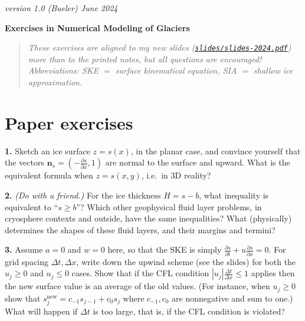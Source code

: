 \documentclass[12pt]{amsart}
\newcommand{\bn}{\mathbf{n}}
\newcommand{\prob}[1]{\bigskip\noindent\textbf{#1.}\quad }
\begin{document}
\scriptsize \hfill \emph{version 1.0 (Bueler) June 2024}
\normalsize\medskip

\large\centerline{\textbf{Exercises in Numerical Modeling of Glaciers}}
\medskip

\normalsize
\begin{quote}
\emph{These exercises are aligned to my new slides {\small \emph{(\href{https://github.com/bueler/mccarthy/blob/master/slides/slides-2024.pdf}{\texttt{slides/slides-2024.pdf}})} } more than to the printed notes, but all questions are encouraged!  Abbreviations: SKE $=$ surface kinematical equation, SIA $=$ shallow ice approximation.}
\end{quote}
\medskip
\thispagestyle{empty}

\section*{Paper exercises}

\prob{1}  Sketch an ice surface $z=s(x)$, in the planar case, and convince yourself that the vectors $\bn_s = (-\frac{\partial s}{\partial x},1)$ are normal to the surface and upward.  What is the equivalent formula when $z=s(x,y)$, i.e.~in 3D reality?

\prob{2}  \emph{(Do with a friend.)}  For the ice thickness $H=s-b$, what inequality is equivalent to ``$s\ge b$''?   Which other geophysical fluid layer problems, in cryosphere contexts and outside, have the same inequalities?  What (physically) determines the shapes of these fluid layers, and their margins and termini?

\prob{3}  Assume $a=0$ and $w=0$ here, so that the SKE is simply $\frac{\partial s}{\partial t} + u \frac{\partial s}{\partial x} = 0$.  For grid spacing $\Delta t,\Delta x$, write down the upwind scheme (see the slides) for both the $u_j\ge 0$ and $u_j\le 0$ cases.  Show that if the CFL condition $|u_j| \frac{\Delta t}{\Delta x} \le 1$ applies then the new surface value is an average of the old values.  (For instance, when $u_j\ge 0$ show that $s_j^{\text{new}} = c_{-1} s_{j-1} + c_0 s_j$ where $c_{-1},c_0$ are nonnegative and sum to one.)  What will happen if $\Delta t$ is too large, that is, if the CFL condition is violated?
\end{document}
